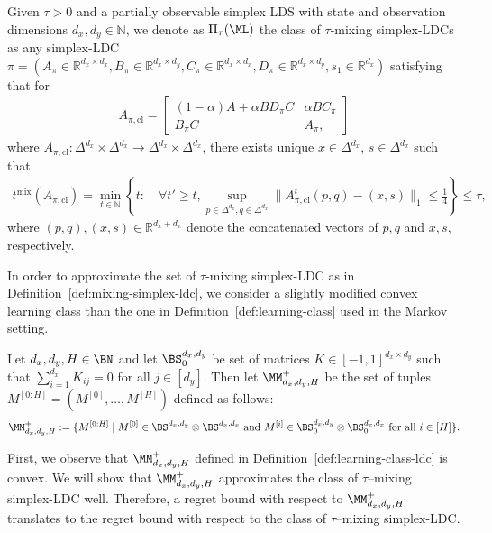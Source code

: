 \begin{definition}
\label{def:mixing-simplex-ldc}
Given $\tau>0$ and a partially observable simplex LDS 
with state and observation dimensions $d_x, d_y\in\mathbb{N}$, we denote as $\Pi_{\tau}(\ML)$ the class of $\tau$-mixing simplex-LDCs as any simplex-LDC $\pi=(A_{\pi}\in\mathbb{R}^{d_x\times d_x}, B_{\pi}\in\mathbb{R}^{d_x\times d_y}, C_{\pi}\in\mathbb{R}^{d_x\times d_x}, D_{\pi}\in\mathbb{R}^{d_x\times d_y}, s_1\in\mathbb{R}^{d_x})$ satisfying that for
\begin{align}
\label{eq:ldc-transition-matrix}
A_{\pi,\mathrm{cl}}=\begin{bmatrix}
(1-\alpha)A+\alpha BD_{\pi}C & \alpha BC_{\pi} \\
 B_{\pi}C & A_{\pi},
\end{bmatrix}
\end{align}
where $A_{\pi,\mathrm{cl}}:\Delta^{d_x}\times\Delta^{d_x}\rightarrow \Delta^{d_x}\times\Delta^{d_x}$, there exists unique $x\in\Delta^{d_x}$, $s\in\Delta^{d_x}$ such that 
\begin{align*}
t^{\mathrm{mix}}(A_{\pi,\mathrm{cl}})=\min_{t\in\mathbb{N}}\left\{t: \quad \forall t'\ge t, \sup_{p\in\Delta^{d_x},q\in\Delta^{d_x}}\|A_{\pi,\mathrm{cl}}^t(p,q)-(x,s)\|_1\le \frac{1}{4}\right\}\le \tau,
\end{align*}
where $(p,q), (x,s)\in\mathbb{R}^{d_x+d_x}$ denote the concatenated vectors of $p, q$ and $x,s$, respectively.
\end{definition}

In order to approximate the set of $\tau$-mixing simplex-LDC as in Definition~\ref{def:mixing-simplex-ldc}, we consider a slightly modified convex learning class than the one in Definition~\ref{def:learning-class} used in the Markov setting. 

\begin{definition} 
\label{def:learning-class-ldc}
Let $d_x,d_y,H \in \BN$ and let $\BS_{0}^{d_x,d_y}$ be set of matrices $K\in[-1,1]^{d_x\times d_y}$ such that $\sum_{i=1}^{d_x} K_{ij} = 0$ for all $j \in [d_y]$. Then let $\MM_{d_x,d_y,H}^{+}$ be the set of tuples ${M^{[0:H]}} = (M^{[0]},\dots,M^{[H]})$ defined as follows:
\begin{align}
\label{eq:M-class-nonmarkov}
\MM_{d_x,d_y,H}^{+} := \{M^{[0:H]}\mid M^{[0]}\in\BS^{d_x,d_y}\otimes \BS^{d_x,d_x} \text{ and } M^{[i]}\in\BS_{0}^{d_x,d_y}\otimes \BS_{0}^{d_x,d_x} \text{ for all }  i \in [H]\}.
\end{align}
\end{definition}
First, we observe that $\MM_{d_x,d_y,H}^{+}$ defined in Definition~\ref{def:learning-class-ldc} is convex. We will show that $\MM_{d_x,d_y,H}^{+}$ approximates the class of $\tau$--mixing simplex-LDC well. Therefore, a regret bound with respect to $\MM_{d_x,d_y,H}^{+}$ translates to the regret bound with respect to the class of $\tau$--mixing simplex-LDC. 

